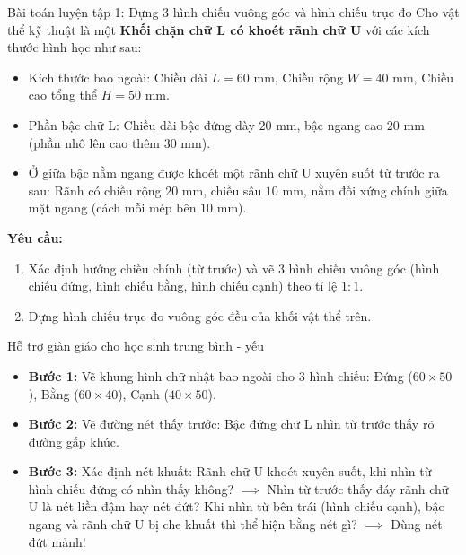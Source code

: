 \documentclass[12pt, a4paper]{article}
\begin{document}
\begin{pedabox}{Bài toán luyện tập 1: Dựng 3 hình chiếu vuông góc và hình chiếu trục đo}
Cho vật thể kỹ thuật là một \textbf{Khối chặn chữ L có khoét rãnh chữ U} với các kích thước hình học như sau:
\begin{itemize}[leftmargin=0.6cm]
    \item Kích thước bao ngoài: Chiều dài $L = 60\text{ mm}$, Chiều rộng $W = 40\text{ mm}$, Chiều cao tổng thể $H = 50\text{ mm}$.
    \item Phần bậc chữ L: Chiều dài bậc đứng dày $20\text{ mm}$, bậc ngang cao $20\text{ mm}$ (phần nhô lên cao thêm $30\text{ mm}$).
    \item Ở giữa bậc nằm ngang được khoét một rãnh chữ U xuyên suốt từ trước ra sau: Rãnh có chiều rộng $20\text{ mm}$, chiều sâu $10\text{ mm}$, nằm đối xứng chính giữa mặt ngang (cách mỗi mép bên $10\text{ mm}$).
\end{itemize}
\textbf{Yêu cầu:}
\begin{enumerate}[leftmargin=0.6cm]
    \item[1.] Xác định hướng chiếu chính (từ trước) và vẽ 3 hình chiếu vuông góc (hình chiếu đứng, hình chiếu bằng, hình chiếu cạnh) theo tỉ lệ $1:1$.
    \item[2.] Dựng hình chiếu trục đo vuông góc đều của khối vật thể trên.
\end{enumerate}
\end{pedabox}

\begin{scaffoldbox}{Hỗ trợ giàn giáo cho học sinh trung bình - yếu}
\begin{itemize}[leftmargin=0.5cm]
    \item \textbf{Bước 1:} Vẽ khung hình chữ nhật bao ngoài cho 3 hình chiếu: Đứng ($60 \times 50$), Bằng ($60 \times 40$), Cạnh ($40 \times 50$).
    \item \textbf{Bước 2:} Vẽ đường nét thấy trước: Bậc đứng chữ L nhìn từ trước thấy rõ đường gấp khúc.
    \item \textbf{Bước 3:} Xác định nét khuất: Rãnh chữ U khoét xuyên suốt, khi nhìn từ hình chiếu đứng có nhìn thấy không? $\implies$ Nhìn từ trước thấy đáy rãnh chữ U là nét liền đậm hay nét đứt? Khi nhìn từ bên trái (hình chiếu cạnh), bậc ngang và rãnh chữ U bị che khuất thì thể hiện bằng nét gì? $\implies$ Dùng nét đứt mảnh!
\end{itemize}
\end{scaffoldbox}
\end{document}
